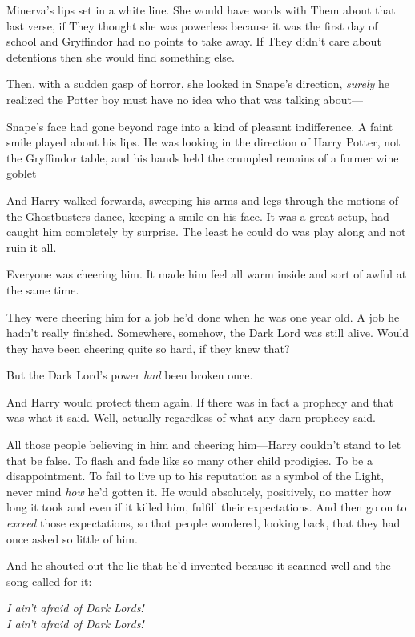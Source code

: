 Minerva's lips set in a white line. She would have words with Them about that
last verse, if They thought she was powerless because it was the first day of
school and Gryffindor had no points to take away. If They didn't care about
detentions then she would find something else.

Then, with a sudden gasp of horror, she looked in Snape's direction,
\emph{surely} he realized the Potter boy must have no idea who that was talking
about—

Snape's face had gone beyond rage into a kind of pleasant indifference. A faint
smile played about his lips. He was looking in the direction of Harry Potter,
not the Gryffindor table, and his hands held the crumpled remains of a former
wine goblet{\el}

And Harry walked forwards, sweeping his arms and legs through the motions of
the Ghostbusters dance, keeping a smile on his face. It was a great setup, had
caught him completely by surprise. The least he could do was play along and not
ruin it all.

Everyone was cheering him. It made him feel all warm inside and sort of awful
at the same time.

They were cheering him for a job he'd done when he was one year old. A job he
hadn't really finished. Somewhere, somehow, the Dark Lord was still alive.
Would they have been cheering quite so hard, if they knew that?

But the Dark Lord's power \emph{had} been broken once.

And Harry would protect them again. If there was in fact a prophecy and that
was what it said. Well, actually regardless of what any darn prophecy said.

All those people believing in him and cheering him—Harry couldn't stand to
let that be false. To flash and fade like so many other child prodigies. To be
a disappointment. To fail to live up to his reputation as a symbol of the
Light, never mind \emph{how} he'd gotten it. He would absolutely, positively,
no matter how long it took and even if it killed him, fulfill their
expectations. And then go on to \emph{exceed} those expectations, so that
people wondered, looking back, that they had once asked so little of him.

And he shouted out the lie that he'd invented because it scanned well and the
song called for it:

\begin{center}
\emph{I ain't afraid of Dark Lords!\\
I ain't afraid of Dark Lords!}
\end{center}

